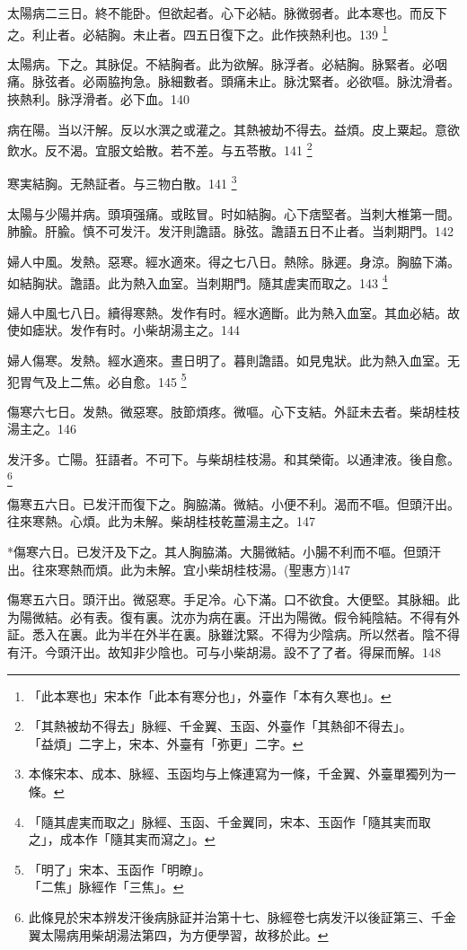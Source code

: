 太陽病二三日。{\khaaitp 終}不能卧。但欲起者。心下必結。脉微弱者。此本寒也。而反下之。利止者。必結胸。未止者。四五日復下之。此{\khaaitp 作}挾熱利也。139
	\footnote{「此本寒也」宋本作「此本有寒分也」，外臺作「本有久寒也」。}

太陽病。下之。其脉促。不結胸者。此为欲解。脉浮者。必結胸。脉緊者。必咽痛。脉弦者。必兩脇拘急。脉細數者。頭痛未止。脉沈緊者。必欲嘔。脉沈滑者。挾熱利。脉浮滑者。必下血。140

病在陽。当以汗解。反以水潠之或灌之。其熱被劫不得去。益煩。皮上粟起。意欲飲水。反不渴。宜服文蛤散。若不差。与五苓散。141
	\footnote{「其熱被劫不得去」脉經、千金翼、玉函、外臺作「其熱卻不得去」。\\「益煩」二字上，宋本、外臺有「弥更」二字。}

寒実結胸。无熱証者。与三物白散。141
	\footnote{本條宋本、成本、脉經、玉函均与上條連寫为一條，千金翼、外臺單獨列为一條。}

太陽与少陽并病。頭項强痛。或眩冒。时如結胸。心下痞堅者。当刺大椎第一間。肺腧。肝腧。慎不可发汗。发汗則譫語。脉弦。譫語五日不止者。当刺期門。142

婦人中風。发熱。惡寒。經水適來。得之七八日。熱除。脉遲。身涼。胸脇下滿。如結胸狀。譫語。此为熱入血室。当刺期門。隨其{\khaaitp 虗}実而取之。143
	\footnote{「隨其虗実而取之」脉經、玉函、千金翼同，宋本、玉函作「隨其実而取之」，成本作「隨其実而瀉之」。}

婦人中風七八日。續得寒熱。发作有时。經水適斷。此为熱入血室。其血必結。故使如瘧狀。发作有时。小柴胡湯主之。144

婦人傷寒。发熱。經水適來。晝日明了。暮則譫語。如見鬼狀。此为熱入血室。无犯胃气及上二焦。必自愈。145
	\footnote{「明了」宋本、玉函作「明瞭」。\\「二焦」脉經作「三焦」。}

傷寒六七日。发熱。微惡寒。肢節煩疼。微嘔。心下支結。外証未去者。柴胡桂枝湯主之。146

发汗多。亡陽。狂語者。不可下。与柴胡桂枝湯。和其榮衛。以通津液。後自愈。
	\footnote{此條見於宋本辨发汗後病脉証并治第十七、脉經卷七病发汗以後証第三、千金翼太陽病用柴胡湯法第四，为方便學習，故移於此。}

傷寒五六日。已发汗而復下之。胸脇滿。微結。小便不利。渴而不嘔。但頭汗出。往來寒熱。心煩。此为未解。柴胡桂枝乾薑湯主之。147

*傷寒六日。已发汗及下之。其人胸脇滿。大腸微結。小腸不利而不嘔。但頭汗出。往來寒熱而煩。此为未解。宜小柴胡桂枝湯。(聖惠方)147

傷寒五六日。頭汗出。微惡寒。手足冷。心下滿。口不欲食。大便堅。其脉細。此为陽微結。必有表。復有裏。沈亦为病在裏。汗出为陽微。假令純陰結。不得有外証。悉入在裏。此为半在外半在裏。脉雖沈緊。不得为少陰病。所以然者。陰不得有汗。今頭汗出。故知非少陰也。可与{\khaaitp 小}柴胡湯。設不了了者。得屎而解。148

